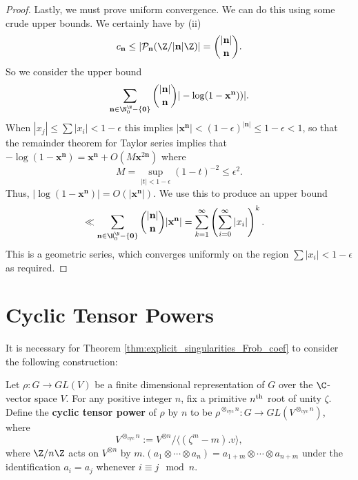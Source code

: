 \documentclass[12pt]{amsart}
\theoremstyle{plain}
\begin{document}
\begin{proof}
Lastly, we must prove uniform convergence. We can do this using some crude upper bounds. We certainly have by (ii)
\[
c_\mathbf{n} \le |\mathcal{P}_\mathbf{n}(\Z/|\mathbf{n}|\Z)| = {|\mathbf{n}|\choose \mathbf{n}}.
\]
So we consider the upper bound
\begin{align*}
\sum_{\mathbf{n}\in \N^{\N}_0-\{\mathbf{0}\}} {|\mathbf{n}|\choose \mathbf{n}} |-\log (1 - \mathbf{x}^\mathbf{n}))|.
\end{align*}
When $|x_j|\le \sum |x_i|<1-\epsilon$ this implies $|\mathbf{x}^\mathbf{n}|<(1-\epsilon)^{|\mathbf{n}|}\le 1-\epsilon < 1$, so that the remainder theorem for Taylor series implies that $-\log(1-\mathbf{x}^\mathbf{n}) = \mathbf{x}^\mathbf{n} + O(M\mathbf{x}^{2\mathbf{n}})$ where
\[
M = \sup_{|t|<1-\epsilon} (1-t)^{-2} \le \epsilon^2.
\]
Thus, $|\log(1-\mathbf{x}^\mathbf{n})| = O(|\mathbf{x}^\mathbf{n}|)$. We use this to produce an upper bound
\begin{align*}
\ll \sum_{\mathbf{n}\in \N^{\N}_0-\{\mathbf{0}\}} {|\mathbf{n}|\choose \mathbf{n}} |\mathbf{x}^\mathbf{n}| &=\sum_{k=1}^{\infty} \left(\sum_{i=0}^\infty|x_i|\right)^k.
\end{align*}
This is a geometric series, which converges uniformly on the region $\sum |x_i|<1-\epsilon$ as required.
\end{proof}











\section{Cyclic Tensor Powers}\label{sec:cyclictensor}

It is necessary for Theorem \ref{thm:explicit_singularities_Frob_coef} to consider the following construction:

\begin{definition}\label{def:cyclic_tensor}
Let $\rho:G\to GL(V)$ be a finite dimensional representation of $G$ over the $\C$-vector space $V$. For any positive integer $n$, fix a primitive $n^{\rm th}$ root of unity $\zeta$. Define the \textbf{cyclic tensor power} of $\rho$ by $n$ to be $\rho^{\otimes_{\text{cyc}} n}:G\to GL(V^{\otimes_{\text{cyc}} n})$, where
\[
V^{\otimes_{\text{cyc}} n}:= V^{\otimes n}/\langle (\zeta^m - m).v\rangle,
\]
where $\Z/n\Z$ acts on $V^{\otimes n}$ by $m.(a_1\otimes \cdots \otimes a_{n})=a_{1+m}\otimes \cdots \otimes a_{n+m}$ under the identification $a_i=a_j$ whenever $i\equiv j\mod n$.
\end{definition}
\end{document}
